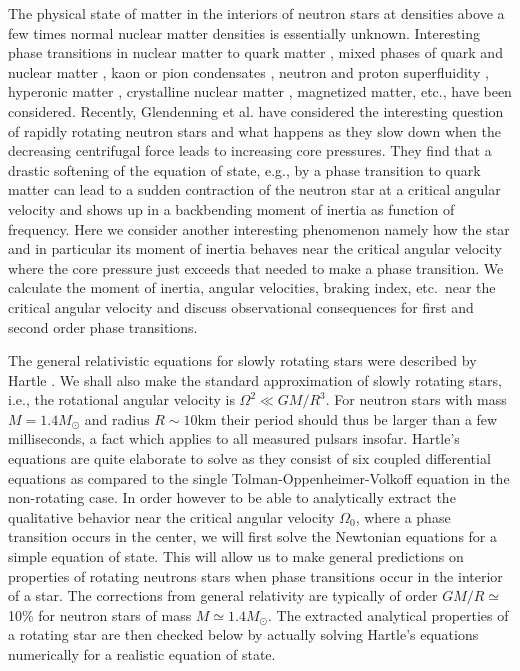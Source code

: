 \begin{multicols}{2}

The physical state of matter in the interiors of neutron stars at
densities above a few times normal nuclear matter densities is
essentially unknown. Interesting phase transitions in nuclear matter 
to quark matter \cite{star_properties},
mixed phases of quark and nuclear matter \cite{Glendenning,HPS}, kaon
\cite{Kaplan} or pion condensates \cite{pion,vijay}, 
neutron and proton superfluidity \cite{oeystein},
hyperonic matter \cite{star_properties,Glendenning},
crystalline nuclear matter \cite{pion}, magnetized matter, etc., have
been considered.  Recently, Glendenning et al. \cite{GPW} have
considered the interesting question of rapidly rotating neutron stars
and what happens as they slow down when the decreasing centrifugal
force leads to increasing core pressures.  They find that a drastic
softening of the equation of state, e.g., by a phase transition to
quark matter can lead to a sudden contraction of the neutron star at
a critical angular velocity and shows up in a backbending moment of
inertia as function of frequency.  Here we consider another
interesting phenomenon namely how the star and in particular its moment
of inertia behaves near the critical angular velocity where the core
pressure just exceeds that needed to make a phase transition. We
calculate the moment of inertia, angular velocities, braking
index, etc.\ near the critical angular velocity and discuss
observational consequences for first and second order phase
transitions.


The general relativistic equations for slowly rotating stars were 
described by Hartle \cite{Hartle}. 
We shall also make the standard approximation of slowly
rotating stars, i.e., the rotational angular velocity is
$\Omega^2 \ll GM/R^3$.
For neutron stars with mass $M=1.4M_\odot$ and
radius $R\sim 10$km their period should thus be larger than a few
milliseconds, a fact which applies to all measured pulsars insofar.
Hartle's equations are quite elaborate to solve
as they consist of six coupled differential equations as compared to
the single Tolman-Oppenheimer-Volkoff 
equation \cite{TOV} in the non-rotating case.
In order however to be able to analytically
extract the qualitative behavior near the critical angular velocity
$\Omega_0$, where a
phase transition occurs in the center, we will first solve the
Newtonian equations for a simple equation of state.
This will allow us to make general predictions on properties
of rotating neutrons stars when phase transitions occur in the interior
of a star.
The corrections from general relativity are typically of order
$GM/R\simeq$10\% for neutron stars of mass $M\simeq 1.4M_\odot$.
The extracted analytical properties of a rotating star 
are then  checked below by actually solving 
Hartle's equations numerically for a realistic equation of state.
 

\end{multicols}

